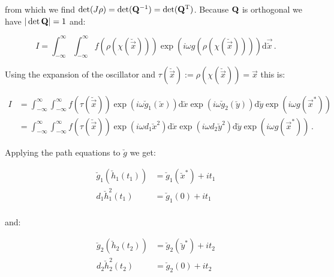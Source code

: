 \documentclass[a4paper,10pt]{article}
\begin{document}
from which we find $\det(J\rho) = \det(\mathbf{Q}{}^{-1}) = \det(\mathbf{Q}{}^{\textnormal{T}})$.
Because $\mathbf{Q}$ is orthogonal we have $|\det\mathbf{Q}| = 1$ and:

\begin{equation}
 I = \int_{-\infty}^{\infty} \int_{-\infty}^{\infty}
       f\left(\rho\left(\chi\left(\breve{\vec{x}}\right)\right)\right)
       \exp\left(i \omega g\left(\rho\left(\chi\left(\breve{\vec{x}}\right)\right)\right)\right)
     \mathrm{d}\vec{\breve{x}} \,.
\end{equation}

Using the expansion of the oscillator and $\tau(\breve{\vec{x}}) := \rho(\chi(\breve{\vec{x}})) = \vec{x}$
this is:

\begin{equation}
\begin{split}
 I & = \int_{-\infty}^{\infty} \int_{-\infty}^{\infty}
         f\left(\tau\left(\breve{\vec{x}}\right)\right)
         \exp\left(i \omega \breve{g}_1\left(\breve{x}\right)\right)
       \mathrm{d}\breve{x}
       \exp\left(i \omega \breve{g}_2\left(\breve{y}\right)\right)
       \mathrm{d}\breve{y}
       \exp\left(i \omega g\left(\vec{x}^{*}\right)\right) \\
   & = \int_{-\infty}^{\infty} \int_{-\infty}^{\infty}
         f\left(\tau\left(\breve{\vec{x}}\right)\right)
         \exp\left(i \omega d_{1}\breve{x}^2\right)
       \mathrm{d}\breve{x}
       \exp\left(i \omega d_{2}\breve{y}^2\right)
       \mathrm{d}\breve{y}
       \exp\left(i \omega g\left(\vec{x}^{*}\right)\right) \,.
\end{split}
\end{equation}

Applying the path equations to $\breve{g}$ we get:

\begin{equation}
\begin{split}
 \breve{g}_1\left(\breve{h}_1(t_1)\right) & = \breve{g}_1\left(\breve{x}^{*}\right) + i t_1 \\
 d_{1}\breve{h}^2_1(t_1)                  & = \breve{g}_1\left(0\right) + i t_1 \\
\end{split}
\end{equation}

and:

\begin{equation}
\begin{split}
 \breve{g}_2\left(\breve{h}_2(t_2)\right) & = \breve{g}_2\left(\breve{y}^{*}\right) + i t_2 \\
 d_{2}\breve{h}^2_2(t_2)                  & = \breve{g}_2\left(0\right) + i t_2 \\
\end{split}
\end{equation}
\end{document}
